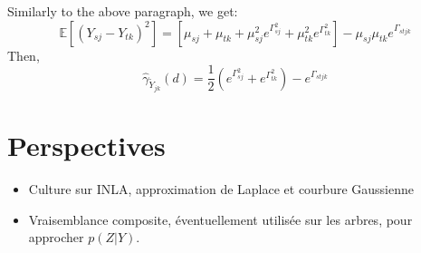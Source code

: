 \documentclass[10pt,a4paper]{article}
\newcommand{\esp}{\mathds{E}}
\begin{document}
Similarly to the above paragraph, we get:
$$ \esp[(Y_{sj} - Y_{tk})^2] = \left[ \mu_{sj}+\mu_{tk} + \mu_{sj}^2 e^{\Gamma_{sj}^2} + \mu_{tk}^2 e^{\Gamma_{tk}^2}\right] - \mu_{sj}\mu_{tk}e^{\Gamma_{stjk}}$$
Then, $$\hat{\gamma}_{\tilde{Y}_{jk}}(d) = \frac{1}{2} \left(e^{\Gamma_{sj}^2}+ e^{\Gamma_{tk}^2}\right) - e^{\Gamma_{stjk}}$$

\section{Perspectives}
\begin{itemize}
\item Culture sur INLA, approximation de Laplace et courbure Gaussienne
\item Vraisemblance composite, éventuellement utilisée sur les arbres, pour approcher $p(Z|Y)$.
\end{itemize}
\end{document}
